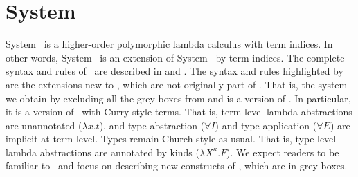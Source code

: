 \section{System \Fi}
\label{sec:Fi}
System \Fi\ is a higher-order polymorphic lambda calculus with term indices.
In other words, System \Fi\ is an extension of System \Fw\ by term indices.
The complete syntax and rules of \Fi\ are described in  and .
The syntax and rules highlighted by  are the extensions
new to \Fi, which are not originally part of \Fw. That is, the system we obtain
by excluding all the grey boxes from  and  is a version of
\Fw. In particular, it is a version of \Fw\ with Curry style terms. That is,
term level lambda abstractions are unannotated ($\lambda x.t$), and
type abstraction ($\forall I$) and type application ($\forall E$) are implicit
at term level. Types remain Church style as usual. That is, type level lambda
abstractions are annotated by kinds ($\lambda X^\kappa.F$). We expect readers
to be familiar to \Fw\ and focus on describing new constructs of \Fi, which
are in grey boxes.

